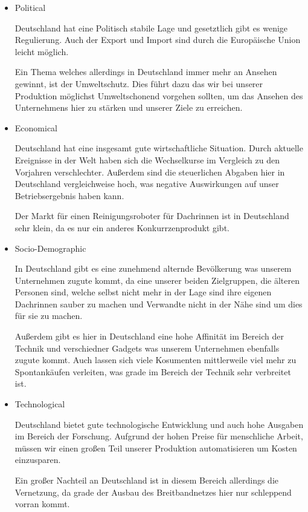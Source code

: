             \begin{itemize}
                \item Political
                
                    Deutschland hat eine Politisch stabile Lage und gesetztlich gibt es wenige Regulierung. Auch der Export
                    und Import sind durch die Europäische Union leicht möglich.
    
                    Ein Thema welches allerdings in Deutschland immer mehr an Ansehen gewinnt, ist der Umweltschutz. Dies 
                    führt dazu das wir bei unserer Produktion möglichst Umweltschonend vorgehen sollten, um das Ansehen des
                    Unternehmens hier zu stärken und unserer Ziele  zu erreichen.
    
                \item Economical
                
                    Deutschland hat eine insgesamt gute wirtschaftliche Situation. Durch aktuelle Ereignisse in der Welt 
                    haben sich die Wechselkurse im Vergleich zu den Vorjahren verschlechter. Außerdem sind die steuerlichen 
                    Abgaben hier in Deutschland vergleichweise hoch, was negative Auswirkungen auf unser Betriebsergebnis
                    haben kann.
    
                    Der Markt für einen Reinigungsroboter für Dachrinnen ist in Deutschland sehr klein, da es nur ein 
                    anderes Konkurrzenprodukt gibt.
    
                \item Socio-Demographic
                
                    In Deutschland gibt es eine zunehmend alternde Bevölkerung was unserem Unternehmen zugute kommt, da eine
                    unserer beiden Zielgruppen, die älteren Personen sind, welche selbst nicht mehr in der Lage sind ihre 
                    eigenen Dachrinnen sauber zu machen und Verwandte nicht in der Nähe sind um dies für sie zu machen.
    
                    Außerdem gibt es hier in Deutschland eine hohe Affinität im Bereich der Technik und verschiedner Gadgets
                    was unserem Unternehmen ebenfalls zugute kommt. Auch lassen sich viele Kosumenten mittlerweile viel mehr 
                    zu Spontankäufen verleiten, was grade im Bereich der Technik sehr verbreitet ist.
    
                \item Technological
                
                    Deutschland bietet gute technologische Entwicklung und auch hohe Ausgaben im Bereich der Forschung. 
                    Aufgrund der hohen Preise für menschliche Arbeit, müssen wir einen großen Teil unserer Produktion 
                    automatisieren um Kosten einzusparen.
    
                    Ein großer Nachteil an Deutschland ist in diesem Bereich allerdings die Vernetzung, da grade der Ausbau
                    des Breitbandnetzes hier nur schleppend vorran kommt.
            \end{itemize}

